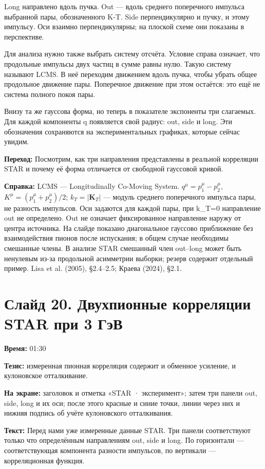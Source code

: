 \documentclass[11pt,a4paper]{article}
\begin{document}
Long направлено вдоль пучка. Out — вдоль среднего поперечного импульса выбранной пары, обозначенного K-T. Side перпендикулярно и пучку, и этому импульсу. Оси взаимно перпендикулярны; на плоской схеме они показаны в перспективе.

Для анализа нужно также выбрать систему отсчёта. Условие справа означает, что продольные импульсы двух частиц в сумме равны нулю. Такую систему называют LCMS. В неё переходим движением вдоль пучка, чтобы убрать общее продольное движение пары. Поперечное движение при этом остаётся: это ещё не система полного покоя пары.

Внизу та же гауссова форма, но теперь в показателе экспоненты три слагаемых. Для каждой компоненты q появляется свой радиус: out, side и long. Эти обозначения сохраняются на экспериментальных графиках, которые сейчас увидим.

\textbf{Переход:} Посмотрим, как три направления представлены в реальной корреляции STAR и почему её форма отличается от свободной гауссовой кривой.

\textbf{Справка:} LCMS — Longitudinally Co-Moving System. \(q^\mu=p_1^\mu-p_2^\mu\), \(K^\mu=(p_1^\mu+p_2^\mu)/2\); \(k_T=|\mathbf K_T|\) — модуль среднего поперечного импульса пары, не разность импульсов. Оси задаются для каждой пары, при k\_T=0 направление out не определено. Out не означает фиксированное направление наружу от центра источника. На слайде показано диагональное гауссово приближение без взаимодействия пионов после испускания; в общем случае необходимы смешанные члены. В анализе STAR смешанный член out–long может быть ненулевым из-за продольной асимметрии выборки; резерв содержит отдельный пример. Lisa et al. (2005), §2.4–2.5; Краева (2024), §2.1.

\clearpage
\section*{Слайд 20. Двухпионные корреляции STAR при 3 ГэВ}
\textbf{Время:} 01:30

\textbf{Тезис:} измеренная пионная корреляция содержит и обменное усиление, и кулоновское отталкивание.

\textbf{На экране:} заголовок и отметка «STAR · эксперимент»; затем три панели out, side, long и их оси; после этого красные и синие точки, линии через них и нижняя подпись об учёте кулоновского отталкивания.

\textbf{Текст:} Перед нами уже измеренные данные STAR. Три панели соответствуют только что определённым направлениям out, side и long. По горизонтали — соответствующая компонента разности импульсов, по вертикали — корреляционная функция.
\end{document}
